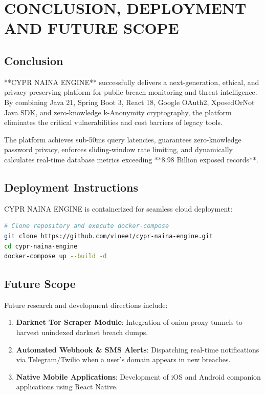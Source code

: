 \documentclass[12pt,a4paper,oneside]{report}
\begin{document}
\chapter{CONCLUSION, DEPLOYMENT AND FUTURE SCOPE}

\section{Conclusion}

**CYPR NAINA ENGINE** successfully delivers a next-generation, ethical, and privacy-preserving platform for public breach monitoring and threat intelligence. By combining Java 21, Spring Boot 3, React 18, Google OAuth2, XposedOrNot Java SDK, and zero-knowledge k-Anonymity cryptography, the platform eliminates the critical vulnerabilities and cost barriers of legacy tools.

The platform achieves sub-50ms query latencies, guarantees zero-knowledge password privacy, enforces sliding-window rate limiting, and dynamically calculates real-time database metrics exceeding **8.98 Billion exposed records**.

\section{Deployment Instructions}

CYPR NAINA ENGINE is containerized for seamless cloud deployment:

\begin{lstlisting}[language=bash, caption={Docker Compose One-Click Deployment}]
# Clone repository and execute docker-compose
git clone https://github.com/vineet/cypr-naina-engine.git
cd cypr-naina-engine
docker-compose up --build -d
\end{lstlisting}

\section{Future Scope}

Future research and development directions include:
\begin{enumerate}
    \item \textbf{Darknet Tor Scraper Module}: Integration of onion proxy tunnels to harvest unindexed darknet breach dumps.
    \item \textbf{Automated Webhook \& SMS Alerts}: Dispatching real-time notifications via Telegram/Twilio when a user's domain appears in new breaches.
    \item \textbf{Native Mobile Applications}: Development of iOS and Android companion applications using React Native.
\end{enumerate}
\end{document}
